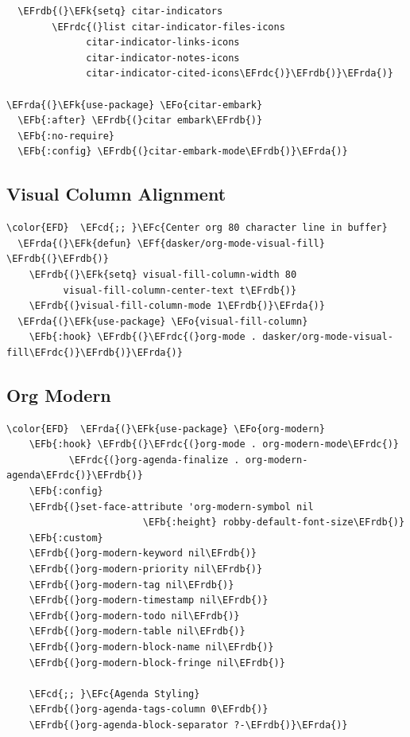 \documentclass[11pt]{article}
\newcommand{\EFc}[1]{\textcolor{EFc}{#1}} %
\newcommand{\EFcd}[1]{\textcolor{EFcd}{#1}} %
\newcommand{\EFk}[1]{\textcolor{EFk}{#1}} %
\newcommand{\EFb}[1]{\textcolor{EFb}{#1}} %
\newcommand{\EFf}[1]{\textcolor{EFf}{#1}} %
\newcommand{\EFo}[1]{\textcolor{EFo}{#1}} %
\newcommand{\EFrda}[1]{\textcolor{EFrda}{#1}} %
\newcommand{\EFrdb}[1]{\textcolor{EFrdb}{#1}} %
\newcommand{\EFrdc}[1]{\textcolor{EFrdc}{#1}} %
\begin{document}
\begin{Code}
\begin{Verbatim}
  \EFrdb{(}\EFk{setq} citar-indicators
        \EFrdc{(}list citar-indicator-files-icons
              citar-indicator-links-icons
              citar-indicator-notes-icons
              citar-indicator-cited-icons\EFrdc{)}\EFrdb{)}\EFrda{)}

\EFrda{(}\EFk{use-package} \EFo{citar-embark}
  \EFb{:after} \EFrdb{(}citar embark\EFrdb{)}
  \EFb{:no-require}
  \EFb{:config} \EFrdb{(}citar-embark-mode\EFrdb{)}\EFrda{)}
\end{Verbatim}
\end{Code}

\subsection{Visual Column Alignment}
\label{sec:orgcd921e8}
\begin{Code}
\begin{Verbatim}
\color{EFD}  \EFcd{;; }\EFc{Center org 80 character line in buffer}
  \EFrda{(}\EFk{defun} \EFf{dasker/org-mode-visual-fill} \EFrdb{(}\EFrdb{)}
    \EFrdb{(}\EFk{setq} visual-fill-column-width 80
          visual-fill-column-center-text t\EFrdb{)}
    \EFrdb{(}visual-fill-column-mode 1\EFrdb{)}\EFrda{)}
  \EFrda{(}\EFk{use-package} \EFo{visual-fill-column}
    \EFb{:hook} \EFrdb{(}\EFrdc{(}org-mode . dasker/org-mode-visual-fill\EFrdc{)}\EFrdb{)}\EFrda{)}
\end{Verbatim}
\end{Code}

\subsection{Org Modern}
\label{sec:orge40ecb0}
\begin{Code}
\begin{Verbatim}
\color{EFD}  \EFrda{(}\EFk{use-package} \EFo{org-modern} 
    \EFb{:hook} \EFrdb{(}\EFrdc{(}org-mode . org-modern-mode\EFrdc{)}
           \EFrdc{(}org-agenda-finalize . org-modern-agenda\EFrdc{)}\EFrdb{)}
    \EFb{:config}
    \EFrdb{(}set-face-attribute 'org-modern-symbol nil
                        \EFb{:height} robby-default-font-size\EFrdb{)}
    \EFb{:custom}
    \EFrdb{(}org-modern-keyword nil\EFrdb{)}
    \EFrdb{(}org-modern-priority nil\EFrdb{)}
    \EFrdb{(}org-modern-tag nil\EFrdb{)}
    \EFrdb{(}org-modern-timestamp nil\EFrdb{)}
    \EFrdb{(}org-modern-todo nil\EFrdb{)}
    \EFrdb{(}org-modern-table nil\EFrdb{)}
    \EFrdb{(}org-modern-block-name nil\EFrdb{)}
    \EFrdb{(}org-modern-block-fringe nil\EFrdb{)}
  
    \EFcd{;; }\EFc{Agenda Styling}
    \EFrdb{(}org-agenda-tags-column 0\EFrdb{)}
    \EFrdb{(}org-agenda-block-separator ?-\EFrdb{)}\EFrda{)}
\end{Verbatim}
\end{Code}
\end{document}
